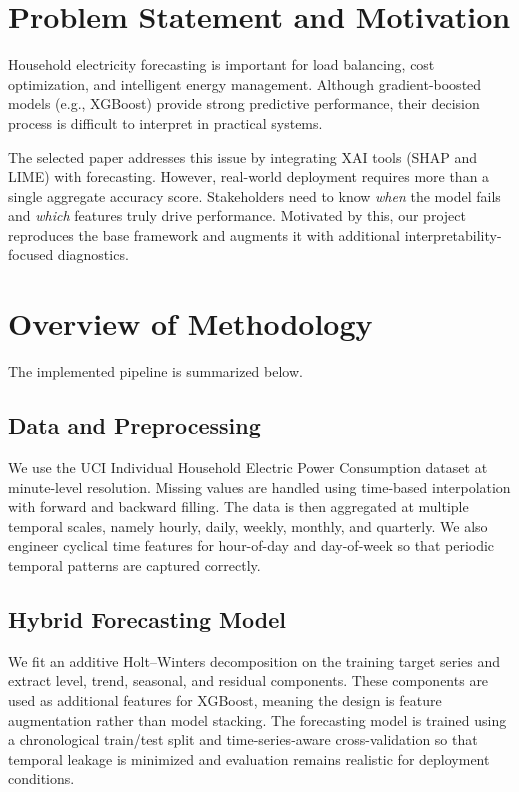 \documentclass[conference]{IEEEtran}
\begin{document}
\section{Problem Statement and Motivation}
Household electricity forecasting is important for load balancing, cost optimization, and intelligent energy management. Although gradient-boosted models (e.g., XGBoost) provide strong predictive performance, their decision process is difficult to interpret in practical systems.

The selected paper addresses this issue by integrating XAI tools (SHAP and LIME) with forecasting. However, real-world deployment requires more than a single aggregate accuracy score. Stakeholders need to know \emph{when} the model fails and \emph{which} features truly drive performance. Motivated by this, our project reproduces the base framework and augments it with additional interpretability-focused diagnostics.

\section{Overview of Methodology}
The implemented pipeline is summarized below.

\subsection{Data and Preprocessing}
We use the UCI Individual Household Electric Power Consumption dataset at minute-level resolution. Missing values are handled using time-based interpolation with forward and backward filling. The data is then aggregated at multiple temporal scales, namely hourly, daily, weekly, monthly, and quarterly. We also engineer cyclical time features for hour-of-day and day-of-week so that periodic temporal patterns are captured correctly.

\subsection{Hybrid Forecasting Model}
We fit an additive Holt--Winters decomposition on the training target series and extract level, trend, seasonal, and residual components. These components are used as additional features for XGBoost, meaning the design is feature augmentation rather than model stacking. The forecasting model is trained using a chronological train/test split and time-series-aware cross-validation so that temporal leakage is minimized and evaluation remains realistic for deployment conditions.
\end{document}
